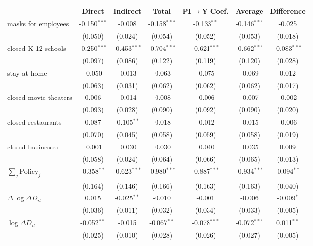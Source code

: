 
\begin{tabular}{lccccc|>{}c}
\toprule
  & Direct & Indirect & Total & PI$\to$Y Coef. & Average & Difference\\
\midrule
masks for employees & -0.150$^{***}$ & -0.008 & -0.158$^{***}$ & -0.133$^{**}$ & -0.146$^{***}$ & -0.025\\
 & (0.050) & (0.024) & (0.054) & (0.052) & (0.053) & (0.018)\\
closed K-12 schools & -0.250$^{***}$ & -0.453$^{***}$ & -0.704$^{***}$ & -0.621$^{***}$ & -0.662$^{***}$ & -0.083$^{***}$\\
 & (0.097) & (0.086) & (0.122) & (0.119) & (0.120) & (0.028)\\
stay at home & -0.050 & -0.013 & -0.063 & -0.075 & -0.069 & 0.012\\
 & (0.063) & (0.031) & (0.062) & (0.062) & (0.062) & (0.017)\\
closed movie theaters & 0.006 & -0.014 & -0.008 & -0.006 & -0.007 & -0.002\\
 & (0.093) & (0.028) & (0.090) & (0.092) & (0.090) & (0.020)\\
closed restaurants & 0.087 & -0.105$^{**}$ & -0.018 & -0.012 & -0.015 & -0.006\\
 & (0.070) & (0.045) & (0.058) & (0.059) & (0.058) & (0.019)\\
closed businesses & -0.001 & -0.030 & -0.030 & -0.040 & -0.035 & 0.009\\
 & (0.058) & (0.024) & (0.064) & (0.066) & (0.065) & (0.013)\\
$\sum_j \mathrm{Policy}_j$ & -0.358$^{**}$ & -0.623$^{***}$ & -0.980$^{***}$ & -0.887$^{***}$ & -0.934$^{***}$ & -0.094$^{**}$\\
 & (0.164) & (0.146) & (0.166) & (0.163) & (0.163) & (0.040)\\
$\Delta \log \Delta D_{it}$ & 0.015 & -0.025$^{**}$ & -0.010 & -0.001 & -0.006 & -0.009$^{*}$\\
 & (0.036) & (0.011) & (0.032) & (0.034) & (0.033) & (0.005)\\
$\log \Delta D_{it}$ & -0.052$^{**}$ & -0.015 & -0.067$^{**}$ & -0.078$^{***}$ & -0.072$^{***}$ & 0.011$^{**}$\\
 & (0.025) & (0.010) & (0.028) & (0.026) & (0.027) & (0.005)\\
\bottomrule
\end{tabular}